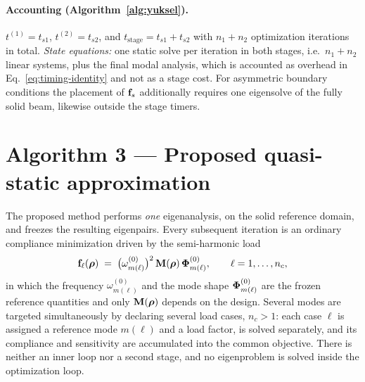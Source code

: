 \paragraph{Accounting (Algorithm~\ref{alg:yuksel}).}
$t^{(1)} = t_{s1}$, $t^{(2)} = t_{s2}$, and
$t_{\mathrm{stage}} = t_{s1} + t_{s2}$ with $n_1 + n_2$ optimization
iterations in total.  \emph{State equations:} one static solve per iteration
in both stages, i.e.\ $n_1 + n_2$ linear systems, plus the final modal
analysis, which is accounted as overhead in
Eq.~\eqref{eq:timing-identity} and not as a stage cost.  For asymmetric
boundary conditions the placement of $\mathbf{f}_s$ additionally requires one
eigensolve of the fully solid beam, likewise outside the stage timers.

\section{Algorithm 3 --- Proposed quasi-static approximation}

The proposed method performs \emph{one} eigenanalysis, on the solid reference
domain, and freezes the resulting eigenpairs.  Every subsequent iteration is
an ordinary compliance minimization driven by the semi-harmonic load
\begin{equation}
  \mathbf{f}_\ell(\bm{\rho}) \;=\;
  \bigl(\omega_{m(\ell)}^{(0)}\bigr)^{2}\,
  \mathbf{M}(\bm{\rho})\,\bm{\Phi}_{m(\ell)}^{(0)},
  \qquad \ell = 1,\ldots,n_c ,
  \label{eq:semiharmonic}
\end{equation}
in which the frequency $\omega_{m(\ell)}^{(0)}$ and the mode shape
$\bm{\Phi}_{m(\ell)}^{(0)}$ are the frozen reference quantities and only
$\mathbf{M}(\bm{\rho})$ depends on the design.  Several modes are targeted
simultaneously by declaring several load cases, $n_c > 1$: each case
$\ell$ is assigned a reference mode $m(\ell)$ and a load factor, is solved
separately, and its compliance and sensitivity are accumulated into the
common objective.  There is neither an inner loop nor a second stage, and no
eigenproblem is solved inside the optimization loop.

